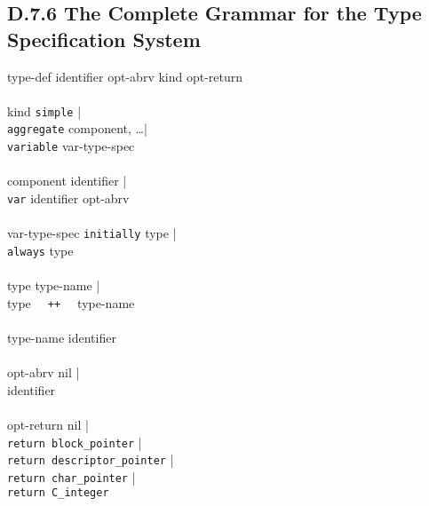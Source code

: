 \subsection{D.7.6 The Complete Grammar for the Type Specification System}
\begin{ebnf}
type-def \>\>\>\> \cceq \>\> identifier opt-abrv \tokcolon kind opt-return\\
\\
kind \>\>\>\>     \cceq \>\> \texttt{simple} |\\
\>\>\>\>\>\>      \texttt{aggregate} \toklbra component, \ldots \tokrbra |\\
\>\>\>\>\>\>      \texttt{variable} var-type-spec\\
\\
component \>\>\>\> \cceq \>\> identifier |\\
\>\>\>\>\>\>                  \texttt{var} identifier opt-abrv\\
\\
var-type-spec \>\>\>\>\cceq \>\> \texttt{initially} type |\\
\>\>\>\>\>\>                     \texttt{always} type\\
\\
type \>\>\>\> \cceq \>\> type-name |\\
\>\>\>\>\>\>             type \texttt{~~++~~} type-name\\
\\
type-name \>\>\>\> \cceq \>\> identifier\\
\\
opt-abrv \>\>\>\>  \cceq \>\> nil |\\
\>\>\>\>\>\>                    \toklcbra identifier \tokrcbra\\
\\
opt-return \>\>\>\>  \cceq \>\>nil |\\
\>\>\>\>\>\>      \texttt{return  block\_pointer} |\\
\>\>\>\>\>\>      \texttt{return  descriptor\_pointer} |\\
\>\>\>\>\>\>      \texttt{return  char\_pointer} |\\
\>\>\>\>\>\>      \texttt{return  C\_integer}\\
\end{ebnf}

\clearpage
\newpage
